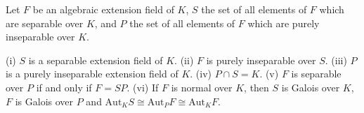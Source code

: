 Let $F$ be an algebraic extension field of $K$, $S$ the set of all elements of $F$ which are separable over $K$, and $P$ the set of all elements of $F$ which are purely inseparable over $K$.

(i) $S$ is a separable extension field of $K$.
(ii) $F$ is purely inseparable over $S$.
(iii) $P$ is a purely inseparable extension field of $K$.
(iv) $P \cap S = K$.
(v) $F$ is separable over $P$ if and only if $F = SP$.
(vi) If $F$ is normal over $K$, then $S$ is Galois over $K$, $F$ is Galois over $P$ and $\mathrm{Aut}_K S \cong \mathrm{Aut}_P F \cong \mathrm{Aut}_K F$.
